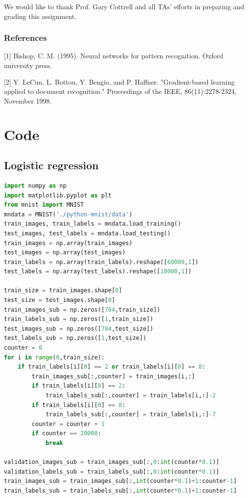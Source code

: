 \documentclass{article} %
\begin{document}
We would like to thank Prof. Gary Cottrell and all TAs' efforts in preparing and grading this assignment.

\subsubsection*{References}

\small{
[1] Bishop, C. M. (1995). Neural networks for pattern recognition. Oxford university press.

[2] Y. LeCun, L. Bottou, Y. Bengio, and P. Haffner. "Gradient-based learning applied to document recognition." Proceedings of the IEEE, 86(11):2278-2324, November 1998.

\section{Code}

\subsection{Logistic regression}
\begin{lstlisting}[language=Python]
%matplotlib inline
import numpy as np
import matplotlib.pyplot as plt
from mnist import MNIST
mndata = MNIST('./python-mnist/data')
train_images, train_labels = mndata.load_training()
test_images, test_labels = mndata.load_testing()
train_images = np.array(train_images)
test_images = np.array(test_images)
train_labels = np.array(train_labels).reshape([60000,1])
test_labels = np.array(test_labels).reshape([10000,1])

train_size = train_images.shape[0]
test_size = test_images.shape[0]
train_images_sub = np.zeros([784,train_size])
train_labels_sub = np.zeros([1,train_size])
test_images_sub = np.zeros([784,test_size])
test_labels_sub = np.zeros([1,test_size])
counter = 0
for i in range(0,train_size):
    if train_labels[i][0] == 2 or train_labels[i][0] == 8:
        train_images_sub[:,counter] = train_images[i,:]
        if train_labels[i][0] == 2:
            train_labels_sub[:,counter] = train_labels[i,:]-2
        if train_labels[i][0] == 8:
            train_labels_sub[:,counter] = train_labels[i,:]-7
        counter = counter + 1
        if counter == 20000:
            break
        
validation_images_sub = train_images_sub[:,0:int(counter*0.1)]
validation_labels_sub = train_labels_sub[:,0:int(counter*0.1)]
train_images_sub = train_images_sub[:,int(counter*0.1)+1:counter-1]
train_labels_sub = train_labels_sub[:,int(counter*0.1)+1:counter-1]


\end{lstlisting}}
\end{document}
